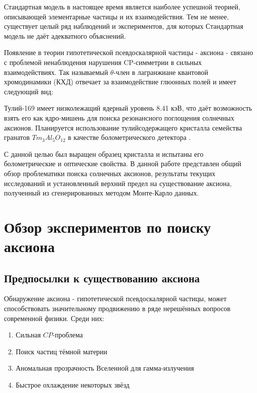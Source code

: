\documentclass[a4paper,article,14pt]{extarticle}
\begin{document}

\tableofcontents
\pagebreak


Стандартная модель в настоящее время является наиболее успешной теорией, описывающей элементарные частицы и их взаимодействия. Тем не менее, существует целый ряд наблюдений и экспериментов, для которых Стандартная модель не даёт адекватного объяснений.

Появление в теории гипотетической псевдоскалярной частицы - аксиона - связано с проблемой ненаблюдения нарушения CP-симметрии в сильных взаимодействиях. Так называемый $\theta$-член в лагранжиане квантовой хромодинамики (КХД) отвечает за взаимодействие глюонных полей и имеет следующий вид:



Тулий-169 имеет низколежащий ядерный уровень 8.41 кэВ, что даёт возможность взять его как ядро-мишень для поиска резонансного поглощения солнечных аксионов. Планируется использование тулийсодержащего кристалла семейства гранатов $Tm_3Al_5O_{12}$ в качестве болометрического детектора . 

С данной целью был выращен образец кристалла и испытаны его болометрические и оптические свойства.  В данной работе представлен общий обзор проблематики поиска солнечных аксионов, результаты текущих исследований и установленный верхний предел на существование аксиона, полученный из сгенерированных методом Монте-Карло данных.


\section{Обзор экспериментов по поиску аксиона}

\subsection{Предпосылки к существованию аксиона}

Обнаружение аксиона - гипотетической псевдоскалярной частицы, может способствовать значительному продвижению в ряде нерешённых вопросов современной физики. Среди них:
\begin{enumerate}
    \item Сильная $CP$-проблема
    \item Поиск частиц тёмной материи
    \item Аномальная прозрачность Вселенной для гамма-излучения
    \item Быстрое охлаждение некоторых звёзд
\end{enumerate}
\end{document}
